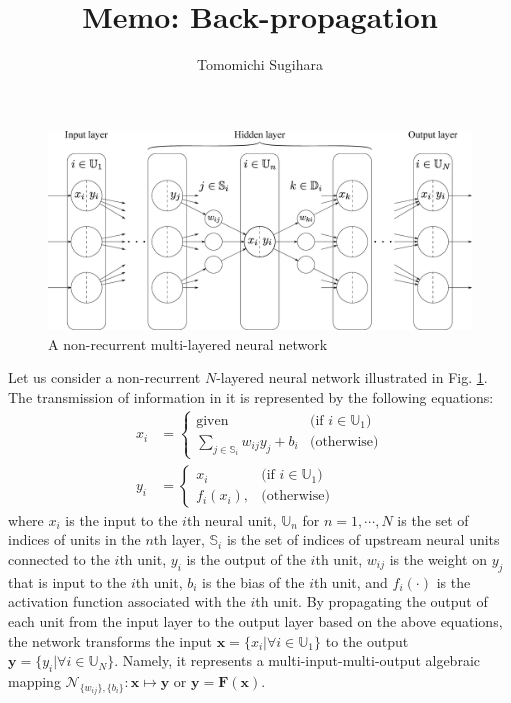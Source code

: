 \documentclass{article}
\title{\large {\bf Memo: Back-propagation}}
\author{Tomomichi Sugihara}
\begin{document}
\maketitle

\begin{figure}[h]
\centering
\includegraphics[width=.7\textwidth]{multilayerednetwork.eps}
\caption{A non-recurrent multi-layered neural network}
\label{fig:multilayerednetwork}
\end{figure}

Let us consider a non-recurrent $N$-layered neural network
illustrated in Fig. \ref{fig:multilayerednetwork}.
The transmission of information in it is represented by the following equations:
\begin{align}
x_{i}&=\begin{cases}
\mbox{given} & \mbox{(if $i\in\mathbb{U}_{1}$)} \\
\sum_{j\in\mathbb{S}_{i}}w_{ij}y_{j}+b_{i} & \mbox{(otherwise)}
\end{cases}
\\
y_{i}&=\begin{cases}
x_{i} & \mbox{(if $i\in\mathbb{U}_{1}$)} \\
f_{i}(x_{i}), & \mbox{(otherwise)}
\end{cases}
\end{align}
where
$x_{i}$ is the input to the $i$th neural unit,
$\mathbb{U}_{n}$ for $n=1, \cdots, N$ is the set of indices of units in the $n$th layer,
$\mathbb{S}_{i}$ is the set of indices of upstream neural units connected to the $i$th unit,
$y_{i}$ is the output of the $i$th unit,
$w_{ij}$ is the weight on $y_{j}$ that is input to the $i$th unit,
$b_{i}$ is the bias of the $i$th unit,
and $f_{i}(\cdot)$ is the activation function associated with the $i$th unit.
By propagating the output of each unit from the input layer to the output layer
based on the above equations,
the network transforms the input $\bm{x}=\{x_{i}|\forall i\in\mathbb{U}_{1}\}$
to the output $\bm{y}=\{y_{i}|\forall i\in\mathbb{U}_{N}\}$.
Namely, it represents a multi-input-multi-output algebraic mapping
$\mathcal{N}_{\{w_{ij}\},\{b_{i}\}}:\bm{x}\mapsto\bm{y}$ or $\bm{y}=\bm{F}(\bm{x})$.
\end{document}
